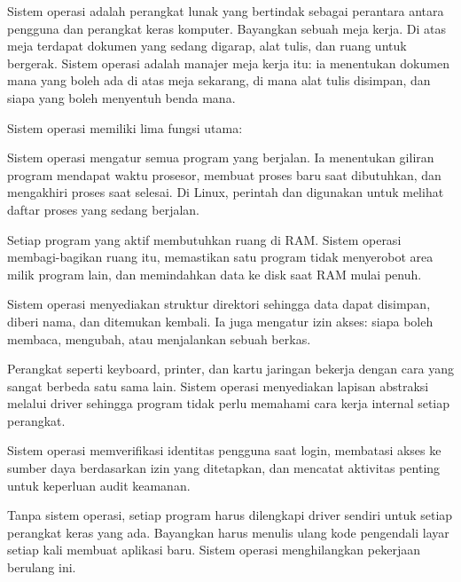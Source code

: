 Sistem operasi adalah perangkat lunak yang bertindak sebagai perantara antara pengguna
dan perangkat keras komputer. Bayangkan sebuah meja kerja. Di atas meja terdapat dokumen
yang sedang digarap, alat tulis, dan ruang untuk bergerak. Sistem operasi adalah manajer
meja kerja itu: ia menentukan dokumen mana yang boleh ada di atas meja sekarang, di mana
alat tulis disimpan, dan siapa yang boleh menyentuh benda mana.

Sistem operasi memiliki lima fungsi utama:

\begin{description}[noitemsep,topsep=2pt,parsep=0pt]
    \item[Manajemen Proses] Sistem operasi mengatur semua program yang berjalan. Ia
    menentukan giliran program mendapat waktu prosesor, membuat proses baru saat
    dibutuhkan, dan mengakhiri proses saat selesai. Di Linux, perintah  dan
     digunakan untuk melihat daftar proses yang sedang berjalan.

    \item[Manajemen Memori] Setiap program yang aktif membutuhkan ruang di RAM. Sistem
    operasi membagi-bagikan ruang itu, memastikan satu program tidak menyerobot area
    milik program lain, dan memindahkan data ke disk saat RAM mulai penuh.

    \item[Manajemen Berkas] Sistem operasi menyediakan struktur direktori sehingga data
    dapat disimpan, diberi nama, dan ditemukan kembali. Ia juga mengatur izin akses:
    siapa boleh membaca, mengubah, atau menjalankan sebuah berkas.

    \item[Manajemen I/O] Perangkat seperti keyboard, printer, dan kartu jaringan
    bekerja dengan cara yang sangat berbeda satu sama lain. Sistem operasi menyediakan
    lapisan abstraksi melalui driver sehingga program tidak perlu memahami cara kerja
    internal setiap perangkat.

    \item[Keamanan dan Proteksi] Sistem operasi memverifikasi identitas pengguna saat
    login, membatasi akses ke sumber daya berdasarkan izin yang ditetapkan, dan mencatat
    aktivitas penting untuk keperluan audit keamanan.
\end{description}

\begin{notebox}
Tanpa sistem operasi, setiap program harus dilengkapi driver sendiri untuk setiap
perangkat keras yang ada. Bayangkan harus menulis ulang kode pengendali layar setiap
kali membuat aplikasi baru. Sistem operasi menghilangkan pekerjaan berulang ini.
\end{notebox}

